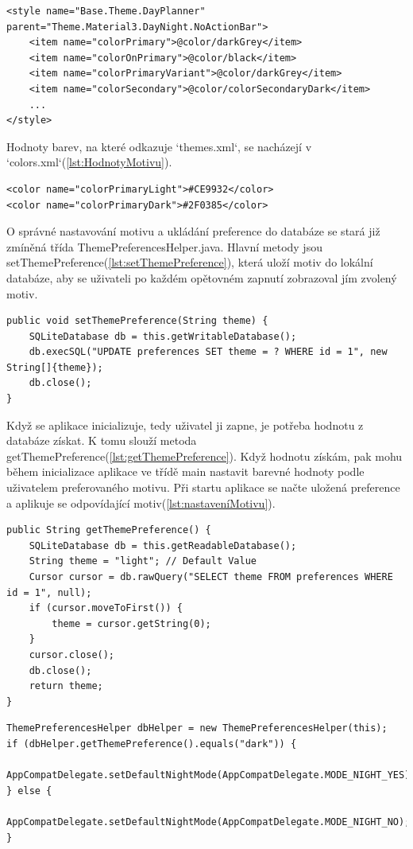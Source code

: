 \begin{lstlisting}[style=xmlstyle,caption = {Hodnoty tmavého motivu},label = {lst:TmMotiv}]
<style name="Base.Theme.DayPlanner" parent="Theme.Material3.DayNight.NoActionBar">
    <item name="colorPrimary">@color/darkGrey</item>
    <item name="colorOnPrimary">@color/black</item>
    <item name="colorPrimaryVariant">@color/darkGrey</item>
    <item name="colorSecondary">@color/colorSecondaryDark</item>
    ...
</style>
\end{lstlisting}
\newpage
Hodnoty barev, na které odkazuje `themes.xml`, se nacházejí v `colors.xml`(\autoref{lst:HodnotyMotivu}). 
\begin{lstlisting}[style=xmlstyle,caption = {Hodnoty barev},label = {lst:HodnotyMotivu}]
<color name="colorPrimaryLight">#CE9932</color>
<color name="colorPrimaryDark">#2F0385</color>
\end{lstlisting}

O správné nastavování motivu a ukládání preference do databáze se stará již zmíněná třída ThemePreferencesHelper.java. Hlavní metody jsou setThemePreference(\autoref{lst:setThemePreference}), která uloží motiv do lokální databáze, aby se uživateli po každém opětovném zapnutí zobrazoval jím zvolený motiv.

\begin{lstlisting}[style=javastyle,caption = {setThemePreference},label = {lst:setThemePreference}]
public void setThemePreference(String theme) {
    SQLiteDatabase db = this.getWritableDatabase();
    db.execSQL("UPDATE preferences SET theme = ? WHERE id = 1", new String[]{theme});
    db.close();
}
\end{lstlisting}

Když se aplikace inicializuje, tedy uživatel ji zapne, je potřeba hodnotu z databáze získat. K tomu slouží metoda getThemePreference(\autoref{lst:getThemePreference}). Když hodnotu získám, pak mohu během inicializace aplikace ve třídě main nastavit barevné hodnoty podle uživatelem preferovaného motivu. Při startu aplikace se načte uložená preference a aplikuje se odpovídající motiv(\autoref{lst:nastaveníMotivu}).

\begin{lstlisting}[style=javastyle,caption = {getThemePreference},label = {lst:getThemePreference}]
public String getThemePreference() {
    SQLiteDatabase db = this.getReadableDatabase();
    String theme = "light"; // Default Value
    Cursor cursor = db.rawQuery("SELECT theme FROM preferences WHERE id = 1", null);
    if (cursor.moveToFirst()) {
        theme = cursor.getString(0);
    }
    cursor.close();
    db.close();
    return theme;
}
\end{lstlisting}
\begin{lstlisting}[style=javastyle,caption = {Nastavení motivu},label = {lst:nastaveníMotivu}]
ThemePreferencesHelper dbHelper = new ThemePreferencesHelper(this);
if (dbHelper.getThemePreference().equals("dark")) {
    AppCompatDelegate.setDefaultNightMode(AppCompatDelegate.MODE_NIGHT_YES);
} else {
    AppCompatDelegate.setDefaultNightMode(AppCompatDelegate.MODE_NIGHT_NO);
}
\end{lstlisting}

